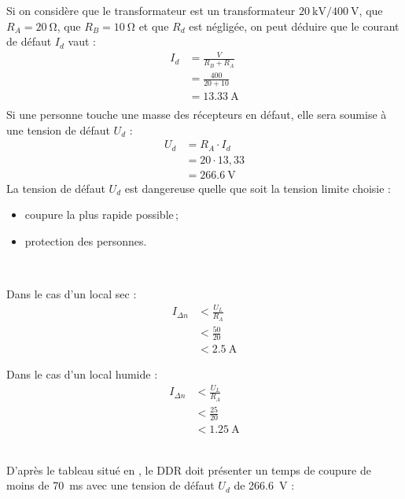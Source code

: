 \begin{exemple}
Si on considère que le transformateur est un transformateur $\SI{20}{\kilo\volt}/\SI{400}{\volt}$, que $R_A=\SI{20}{\ohm}$, que $R_B=\SI{10}{\ohm}$ et que $R_d$ est négligée, on peut déduire que le courant de défaut $I_d$ vaut :
\begin{align*}
		I_d 	&= \frac{V}{R_{B}+R_{A}} \\
				&=\frac{400}{20+10} \\
				&= \SI{13,33}{\ampere} \\
\end{align*}
Si une personne touche une masse des récepteurs en défaut, elle sera soumise à une tension de défaut $U_d$ :
\begin{align*}
		U_d 	&= R_{A} \cdot I_{d} \\
				&=20 \cdot 13,33 \\
				&= \SI{266,6}{\volt}
\end{align*}
La tension de défaut $U_d$ est dangereuse quelle que soit la tension limite choisie :
\begin{itemize}
\item coupure la plus rapide possible\,;
\item protection des personnes.
\end{itemize}
~\\
\begin{minipage}[t]{0.5\linewidth}
Dans le cas d'un local sec :
\begin{align*}
	I_{\Delta n} 	&< \frac{U_{L}}{R_{A}} \\
						&< \frac{50}{20} \\
						&< \SI{2,5}{\ampere}
\end{align*}
\end{minipage}
\hfill
\begin{minipage}[t]{0.5\linewidth}
Dans le cas d'un local humide :
\begin{align*}
	I_{\Delta n} 	&< \frac{U_{L}}{R_{A}} \\
						&< \frac{25}{20} \\
						&< \SI{1,25}{\ampere}
\end{align*}
\end{minipage}
~\\
D'après le tableau situé en , le DDR doit présenter un temps de coupure de moins de \SI{70}{\milli\second} avec une tension de défaut $U_d$ de \SI{266,6}{\volt} :


\end{exemple}
